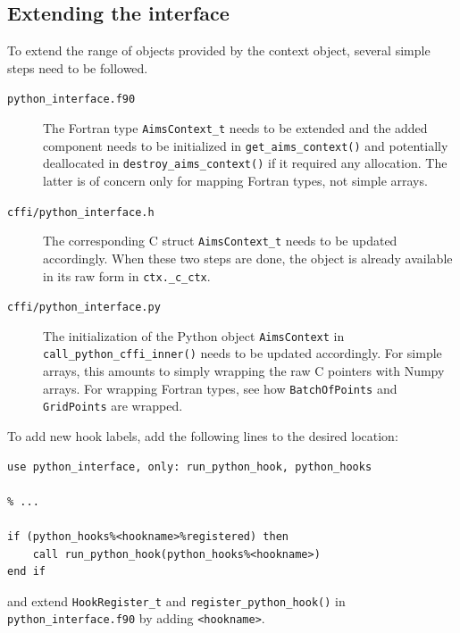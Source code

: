 \subsection*{Extending the interface}

To extend the range of objects provided by the context object, several simple
steps need to be followed.

\begin{description}

\item[\texttt{python\_interface.f90}] The Fortran type \verb+AimsContext_t+
needs to be extended and the added component needs to be initialized in
\verb+get_aims_context()+ and potentially deallocated in
\verb+destroy_aims_context()+ if it required any allocation.
The latter is of concern only for mapping Fortran types, not simple arrays.
\item[\texttt{cffi/python\_interface.h}] The corresponding C struct
\verb+AimsContext_t+ needs to be updated accordingly.
When these two steps are done, the object is already available in its raw form
in \verb+ctx._c_ctx+.
\item[\texttt{cffi/python\_interface.py}] The initialization of the Python
object \verb+AimsContext+ in \verb+call_python_cffi_inner()+ needs to be
updated accordingly.
For simple arrays, this amounts to simply wrapping the raw C pointers with
Numpy arrays.
For wrapping Fortran types, see how \verb+BatchOfPoints+ and \verb+GridPoints+
are wrapped.

\end{description}

To add new hook labels, add the following lines to the desired location:
\begin{verbatim}
use python_interface, only: run_python_hook, python_hooks

% ...

if (python_hooks%<hookname>%registered) then
    call run_python_hook(python_hooks%<hookname>)
end if
\end{verbatim}
and extend \verb+HookRegister_t+ and \verb+register_python_hook()+ in
\verb+python_interface.f90+ by adding \verb+<hookname>+.
